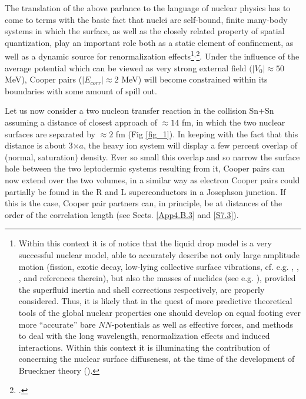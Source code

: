 The translation of the above parlance to the language of nuclear physics has to come to terms with the basic fact that nuclei are self-bound, finite many-body systems in which the surface, as well as the closely related property of spatial quantization, play an important role both as a static element of confinement, as well as a dynamic source for renormalization effects\footnote{Within this context it is of notice that the liquid drop model is a very successful nuclear model, able to accurately describe not only large amplitude motion (fission, exotic decay, low-lying collective  surface vibrations, cf. e.g. \cite{Bohr:39}, \cite{Bertsch:88b}, \cite{Barranco:90}, and references therein), but also the masses of nuclides (see e.g. \cite{Moller:95}), provided the superfluid inertia and shell corrections respectively, are properly considered. Thus, it is likely that in the quest of  more predictive theoretical tools of the global nuclear properties one should develop on equal footing ever more ``accurate'' bare $NN$-potentials as well as effective forces, and methods to deal with the long wavelength, renormalization effects and induced interactions. Within this context it is illuminating the contribution of \cite{Anderson:62} concerning the nuclear surface diffuseness, at the time of the development of  Brueckner theory (\cite{Brueckner:61}).}$^,$\footnote{\cite{Broglia:02d}.}.
Under the influence of the average potential which can be viewed as very strong external field $(|V_0|\approx 50$ MeV), Cooper pairs ($|E_{corr}|\approx 2$ MeV) will become constrained within its boundaries with some amount of spill out. 


Let us now consider a two nucleon transfer reaction in the collision Sn+Sn assuming a distance of closest approach of $\approx 14$ fm, in which the two nuclear surfaces are separated by $\approx 2$ fm (Fig \ref{fig_1}). In keeping with the fact that this distance is about 3$\times a$, the heavy ion system will display a few percent overlap of (normal, saturation) density. Ever so small this overlap and so narrow the surface hole between the two leptodermic systems resulting from  it,  Cooper pairs can now extend over the two volumes, in a similar way as electron Cooper pairs could  partially be found in the R and L superconductors in a Josephson junction. If this is the case, Cooper pair partners can, in principle, be at distances of the order of the  correlation length (see Sects. \ref{App4.B.3} and \ref{S7.3}). 

